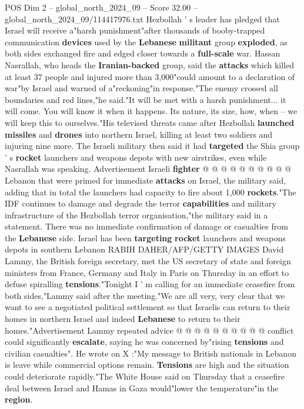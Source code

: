 \begin{textsample}{POS Dim 2 – global\_north\_2024\_09 – Score 32.00 – global\_north\_2024\_09/114417976.txt}  \label{ex:f2_pos_121}
Hezbollah ' s leader has pledged that Israel will receive a"harsh punishment"after thousands of booby-trapped communication \textbf{devices} used by the \textbf{Lebanese} \textbf{militant} group \textbf{exploded}, as both sides exchanged fire and edged closer towards a \textbf{full-scale} war.
Hassan Nasrallah, who heads the \textbf{Iranian-backed} group, said the \textbf{attacks} which killed at least 37 people and injured more than 3,000"could amount to a declaration of war"by Israel and warned of a"reckoning"in response."The enemy crossed all boundaries and red lines,"he said."It will be met with a harsh punishment... it will come.
You will know it when it happens.
Its nature, its size, how, when -- we will keep this to ourselves."His televised threats came after Hezbollah \textbf{launched} \textbf{missiles} and \textbf{drones} into northern Israel, killing at least two soldiers and injuring nine more.
The Israeli military then said it had \textbf{targeted} the Shia group ' s \textbf{rocket} launchers and weapons depots with new airstrikes, even while Nasrallah was speaking.
Advertisement Israeli \textbf{fighter} @ @ @ @ @ @ @ @ @ @ Lebanon that were primed for immediate \textbf{attacks} on Israel, the military said, adding that in total the launchers had capacity to fire about 1,000 \textbf{rockets}."The IDF continues to damage and degrade the terror \textbf{capabilities} and military infrastructure of the Hezbollah terror organisation,"the military said in a statement.
There was no immediate confirmation of damage or casualties from the \textbf{Lebanese} side.
Israel has been \textbf{targeting} \textbf{rocket} launchers and weapons depots in southern Lebanon RABIH DAHER/AFP/GETTY IMAGES David Lammy, the British foreign secretary, met the US secretary of state and foreign ministers from France, Germany and Italy in Paris on Thursday in an effort to defuse spiralling \textbf{tensions}."Tonight I ' m calling for an immediate ceasefire from both sides,"Lammy said after the meeting."We are all very, very clear that we want to see a negotiated political settlement so that Israelis can return to their homes in northern Israel and indeed \textbf{Lebanese} to return to their homes."Advertisement Lammy repeated advice @ @ @ @ @ @ @ @ @ @ conflict could significantly \textbf{escalate}, saying he was concerned by"rising \textbf{tensions} and civilian casualties".
He wrote on X :"My message to British nationals in Lebanon is leave while commercial options remain. \textbf{Tensions} are high and the situation could deteriorate rapidly."The White House said on Thursday that a ceasefire deal between Israel and Hamas in Gaza would"lower the temperature"in the \textbf{region}.

\end{textsample}
